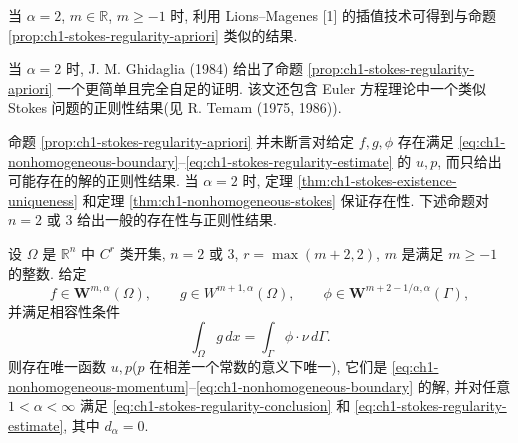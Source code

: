 \begin{Remark}
\label{rem:ch1-stokes-fractional-regularity}
当 $\alpha=2$, $m\in\mathbb R$, $m\geq-1$ 时, 利用 Lions--Magenes [1] 的插值技术可得到与命题 \ref{prop:ch1-stokes-regularity-apriori} 类似的结果.
\end{Remark}

\begin{Remark}
\label{rem:ch1-stokes-ghidaglia-regularity}
当 $\alpha=2$ 时, J. M. Ghidaglia (1984) 给出了命题 \ref{prop:ch1-stokes-regularity-apriori} 一个更简单且完全自足的证明. 该文还包含 Euler 方程理论中一个类似 Stokes 问题的正则性结果(见 R. Temam (1975, 1986)).
\end{Remark}

命题 \ref{prop:ch1-stokes-regularity-apriori} 并未断言对给定 $f,g,\phi$ 存在满足 \eqref{eq:ch1-nonhomogeneous-boundary}--\eqref{eq:ch1-stokes-regularity-estimate} 的 $u,p$, 而只给出可能存在的解的正则性结果. 当 $\alpha=2$ 时, 定理 \ref{thm:ch1-stokes-existence-uniqueness} 和定理 \ref{thm:ch1-nonhomogeneous-stokes} 保证存在性. 下述命题对 $n=2$ 或 $3$ 给出一般的存在性与正则性结果.

\begin{Proposition}
\label{prop:ch1-stokes-full-regularity}
设 $\Omega$ 是 $\mathbb R^n$ 中 $C^r$ 类开集, $n=2$ 或 $3$, $r=\max(m+2,2)$, $m$ 是满足 $m\geq-1$ 的整数. 给定
\[
f\in\mathbf W^{m,\alpha}(\Omega),\qquad
g\in W^{m+1,\alpha}(\Omega),\qquad
\phi\in\mathbf W^{m+2-1/\alpha,\alpha}(\Gamma),
\]
并满足相容性条件
\begin{equation}
\int_\Omega g\,dx=\int_\Gamma\phi\cdot\nu\,d\Gamma.
\label{eq:ch1-stokes-full-compatibility}
\end{equation}
则存在唯一函数 $u,p$($p$ 在相差一个常数的意义下唯一), 它们是 \eqref{eq:ch1-nonhomogeneous-momentum}--\eqref{eq:ch1-nonhomogeneous-boundary} 的解, 并对任意 $1<\alpha<\infty$ 满足 \eqref{eq:ch1-stokes-regularity-conclusion} 和 \eqref{eq:ch1-stokes-regularity-estimate}, 其中 $d_\alpha=0$.
\end{Proposition}

